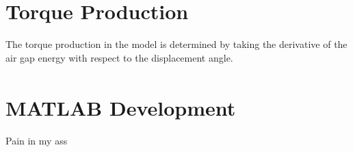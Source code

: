 \section{Torque Production}


The torque production in the model is determined by taking the derivative of the air gap energy with respect to the displacement angle.





\section{MATLAB\textsuperscript{\textregistered} Development}
Pain in my ass
